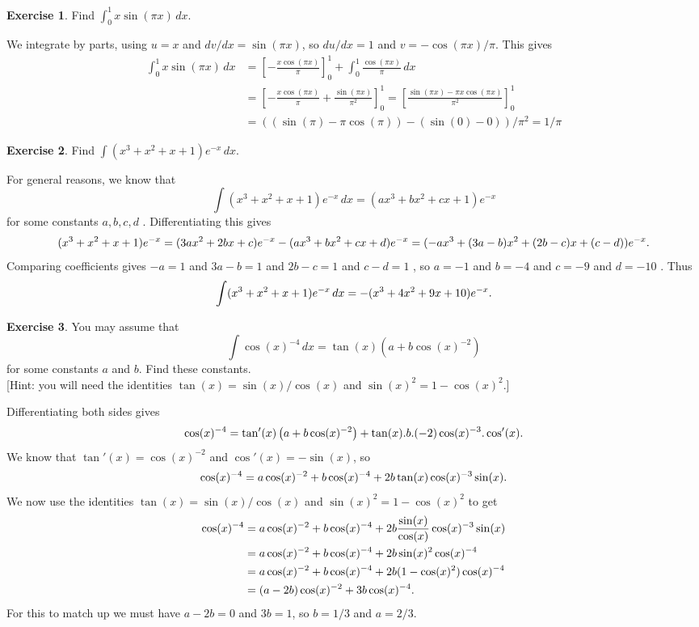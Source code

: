 \documentclass[a4paper]{amsart}
\theoremstyle{definition}
\newtheorem{exercise}{Exercise}[section]
\newenvironment{solution}{{\noindent \bf Solution:}}{}
\begin{document}
\begin{exercise}
 Find $\displaystyle\int_0^1x\sin(\pi x)\,dx$. 
\end{exercise}
\begin{solution}
 We integrate by parts, using $u=x$ and $dv/dx=\sin(\pi x)$, so
 $du/dx=1$ and $v=-\cos(\pi x)/\pi$.  This gives 
 \begin{align*}
  \int_0^1x\sin(\pi x)\,dx
    &= \left[-\frac{x\cos(\pi x)}{\pi}\right]_0^1 +
        \int_0^1 \frac{\cos(\pi x)}{\pi}\,dx \\
    &= \left[-\frac{x\cos(\pi x)}{\pi}+
             \frac{\sin(\pi x)}{\pi^2}\right]_0^1
     = \left[\frac{\sin(\pi x)-\pi x\cos(\pi x)}{\pi^2}\right]_0^1 \\
    &= ((\sin(\pi)-\pi\cos(\pi))-(\sin(0)-0))/\pi^2 = 1/\pi
 \end{align*}
\end{solution}

\begin{exercise}
 Find $\int (x^3+x^2+x+1)e^{-x}\, dx$.  
\end{exercise}
\begin{solution}
 For general reasons, we know that 
 \[ \int (x^3+x^2+x+1) e^{-x} \, dx =
     (ax^3+bx^2+cx+1)e^{-x}
 \]
 for some constants $a,b,c,d$ . 
 Differentiating this gives 
 \[ (x^3+x^2+x+1) e^{-x} =
     (3ax^2+2bx+c) e^{-x} - (ax^3+bx^2+cx+d)e^{-x}
      = (-ax^3 + (3a-b)x^2 + (2b-c)x + (c-d))e^{-x}. \mk 
 \]
 Comparing coefficients gives $-a=1$ and $3a-b=1$ and
 $2b-c=1$ and $c-d=1$ \mk, so $a=-1$ and $b=-4$ and $c=-9$ and
 $d=-10$ \mk.  Thus
 \[ \int (x^3+x^2+x+1)e^{-x} \,dx =
     -(x^3+4x^2+9x+10)e^{-x}. 
    \mk
 \]
\end{solution}

\begin{exercise}
 You may assume that
 \[ \int\cos(x)^{-4}\,dx = \tan(x)\left(a + b\cos(x)^{-2}\right) \]
 for some constants $a$ and $b$.  Find these constants.  \\{}
 [Hint: you will need the identities $\tan(x)=\sin(x)/\cos(x)$ and
 $\sin(x)^2=1-\cos(x)^2$.]
\end{exercise}
\begin{solution}
 Differentiating both sides gives
 \[  \cos(x)^{-4} = \tan'(x)\left(a+b\cos(x)^{-2}\right) +
                    \tan(x).b.(-2)\cos(x)^{-3}.\cos'(x). \mks{2}
 \]
 We know that $\tan'(x)=\cos(x)^{-2}$ \mk and $\cos'(x)=-\sin(x)$, so
 \[ \cos(x)^{-4} =
     a\cos(x)^{-2} + b\cos(x)^{-4} +
      2b\tan(x)\cos(x)^{-3}\sin(x). \mks{2}
 \]
 We now use the identities $\tan(x)=\sin(x)/\cos(x)$ and
 $\sin(x)^2=1-\cos(x)^2$ to get
 \begin{align*}
  \cos(x)^{-4} &=
     a\cos(x)^{-2} + b\cos(x)^{-4} +
      2b\frac{\sin(x)}{\cos(x)}\cos(x)^{-3}\sin(x) \mk \\
   &= a\cos(x)^{-2} + b\cos(x)^{-4} + 2b\sin(x)^2\cos(x)^{-4} \\
   &= a\cos(x)^{-2} + b\cos(x)^{-4} + 2b(1-\cos(x)^2)\cos(x)^{-4} \\
   &= (a-2b)\cos(x)^{-2} + 3b\cos(x)^{-4}. \mk
 \end{align*}
 For this to match up we must have $a-2b=0$ and $3b=1$, so $b=1/3$ and
 $a=2/3$. \mk
\end{solution}
\end{document}
